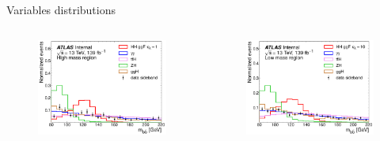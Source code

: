 \begin{frame}{Variables distributions}
\begin{columns}
\begin{figure}
    \centering
    \includegraphics[width=1.\textwidth]{BackUp/Part3/Img/var_SM_bb_M.pdf}
\end{figure}
\begin{figure}
    \centering
    \includegraphics[width=1.\textwidth]{BackUp/Part3/Img/var_BSM_bb_M.pdf}
\end{figure}
\end{columns}
\end{frame}


